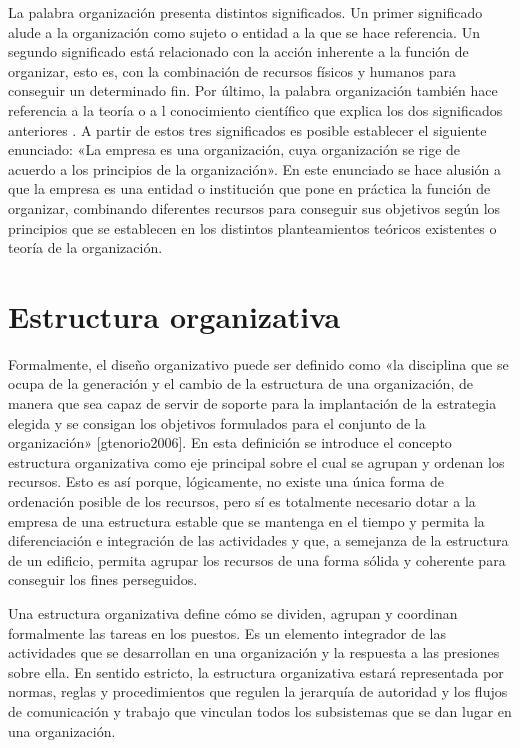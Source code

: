 \documentclass[
]{krantz}
\begin{document}
La palabra organización presenta distintos significados. Un primer significado alude a la organización como sujeto o entidad a la que se hace referencia. Un segundo significado está relacionado con la acción inherente a la función de organizar, esto es, con la combinación de recursos físicos y humanos para conseguir un determinado fin. Por último, la palabra organización también hace referencia a la teoría o a l conocimiento científico que explica los dos significados anteriores \citep{bueno2005}. A partir de estos tres significados es posible establecer el siguiente enunciado: «La empresa es una organización, cuya organización se rige de acuerdo a los principios de la organización». En este enunciado se hace alusión a que la empresa es una entidad o institución que pone en práctica la función de organizar, combinando diferentes recursos para conseguir sus objetivos según los principios que se establecen en los distintos planteamientos teóricos existentes o teoría de la organización.

\hypertarget{estructura-organizativa}{%
\section{Estructura organizativa}\label{estructura-organizativa}}

Formalmente, el diseño organizativo puede ser definido como «la disciplina que se ocupa de la generación y el cambio de la estructura de una organización, de manera que sea capaz de servir de soporte para la implantación de la estrategia elegida y se consigan los objetivos formulados para el conjunto de la organización» {[}gtenorio2006{]}. En esta definición se introduce el concepto estructura organizativa como eje principal sobre el cual se agrupan y ordenan los recursos. Esto es así porque, lógicamente, no existe una única forma de ordenación posible de los recursos, pero sí es totalmente necesario dotar a la empresa de una estructura estable que se mantenga en el tiempo y permita la diferenciación e integración de las actividades y que, a semejanza de la estructura de un edificio, permita agrupar los recursos de una forma sólida y coherente para conseguir los fines perseguidos.

Una estructura organizativa define cómo se dividen, agrupan y coordinan formalmente las tareas en los puestos. Es un elemento integrador de las actividades que se desarrollan en una organización y la respuesta a las presiones sobre ella. En sentido estricto, la estructura organizativa estará representada por normas, reglas y procedimientos que regulen la jerarquía de autoridad y los flujos de comunicación y trabajo que vinculan todos los subsistemas que se dan lugar en una organización.
\end{document}
